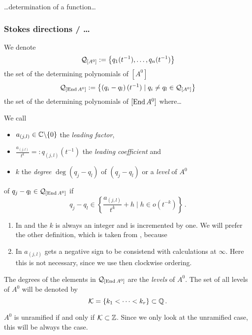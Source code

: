 \dots{}determination of a function\dots

\subsubsection{Stokes directions / \dots}
\begin{comment}
  \cite[I.4]{Loday1994}
\end{comment}
We denote
\[
  \mathcal{Q}_{[A^0]}:=\left\{q_1(t^{-1}),\dots,q_n(t^{-1})\right\}
\]
the set of the determining polynomials of $[A^0]$
\[
  \mathcal{Q}_{[\operatorname{End} A^0]}:=\left\{\left(q_i-q_l\right)(t^{-1})
    \mid q_i \neq q_l \in\mathcal{Q}_{[A^0]}
  \right\}
\]
the set of the determining polynomials of $[\operatorname{End} A^0]$ where\dots
\begin{defn}
  We call
  \begin{itemize}
    \item $a_{(j,l)}\in\mathbb{C}\backslash\{0\}$ the \emph{leading factor},
    \item $\frac{a_{(j,l)}}{t^k}=:q_{(j,l)}(t^{-1})$ the \emph{leading
      coefficient} and
    \item $k$ the \emph{degree} $\deg(q_j-q_l)$ of $(q_j-q_l)$ or a
      \emph{level} of $A^0$
  \end{itemize}
  of $q_j-q_l\in\mathcal{Q}_{[\operatorname{End} A^0]}$ if
  \[
    q_j-q_l\in\left\{ \frac{a_{(j,l)}}{t^k}+h \mid h \in o(t^{-k})\right\} \,.
  \]
  \begin{rem}
    \begin{enumerate}
      \item In \cite{boalch} and \cite{thboalch} the $k$ is always an integer
        and is incremented by one. We will prefer the other definition, which
        is taken from \cite{Loday1994}, because \TODO
      \item In \cite[Def.4.3.6]{Loday2014} $a_{(j,l)}$ gets a negative sign to
        be consistend with calculations at $\infty$. Here this is not
        necessary, since we use then clockwise ordering.
    \end{enumerate}
  \end{rem}
  The degrees of the elements in $\mathcal{Q}_{[\operatorname{End} A^0]}$ are the
  \emph{levels} of $A^0$.
  The set of all levels of $A^0$ will be denoted by
  \[
    \mathcal{K}=\{k_1<\dots<k_r\} \subset \mathbb{Q} \,.
  \]
  \begin{rem}
    $A^0$ is unramified if and only if $\mathcal{K}\subset\mathbb{Z}$. Since we only look at
    the unramified case, this will be always the case.
  \end{rem}
\end{defn}

